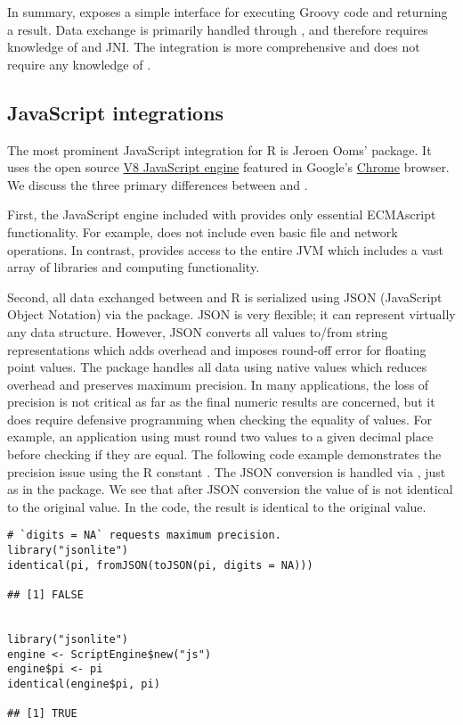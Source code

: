 In summary,  exposes a simple interface for executing Groovy code and returning a result. Data exchange is primarily handled through , and therefore requires knowledge of  and JNI. The  integration is more comprehensive and does not require any knowledge of .

\hypertarget{javascriptintegrations}{\subsection{JavaScript integrations}}

The most prominent JavaScript integration for R is Jeroen Ooms'  package. It uses the open source \href{https://developers.google.com/v8/}{V8 JavaScript engine} featured in Google's \href{https://www.google.com/chrome/browser/features.html}{Chrome} browser. We discuss the three primary differences between  and .

First, the JavaScript engine included with  provides only essential ECMAscript functionality. For example,  does not include even basic file and network operations. In contrast,  provides access to the entire JVM which includes a vast array of libraries and computing functionality.

Second, all data exchanged between  and R is serialized using JSON (JavaScript Object Notation) via the  package. JSON is very flexible; it can represent virtually any data structure. However, JSON converts all values to/from string representations which adds overhead and imposes round-off error for floating point values. The  package handles all data using native values which reduces overhead and preserves maximum precision. In many applications, the loss of precision is not critical as far as the final numeric results are concerned, but it does require defensive programming when checking the equality of values. For example, an application using  must round two values to a given decimal place before checking if they are equal. The following code example demonstrates the precision issue using the R constant . The JSON conversion is handled via , just as in the  package. We see that after JSON conversion the value of  is not identical to the original value. In the  code, the result is identical to the original value.

\begin{verbatim}
# `digits = NA` requests maximum precision.
library("jsonlite")
identical(pi, fromJSON(toJSON(pi, digits = NA)))

## [1] FALSE


library("jsonlite")
engine <- ScriptEngine$new("js")
engine$pi <- pi
identical(engine$pi, pi)

## [1] TRUE
\end{verbatim}

